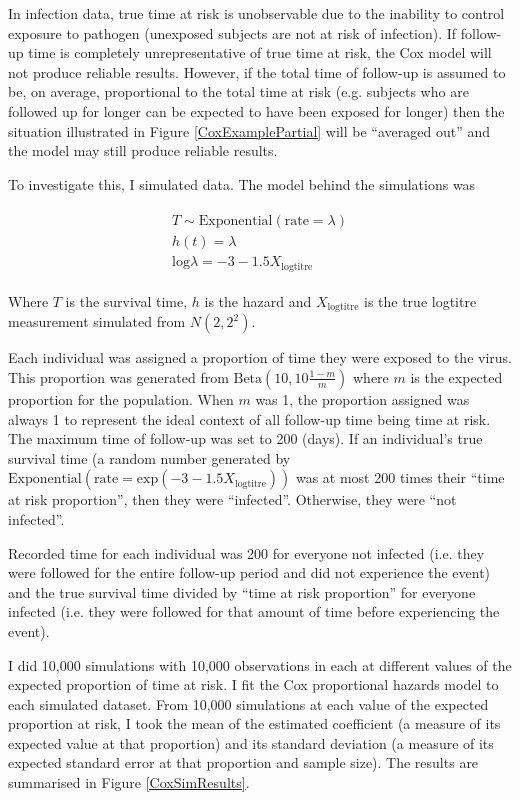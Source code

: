 \documentclass[12pt]{article}
\begin{document}
\pagebreak

In infection data, true time at risk is unobservable due to the inability to control exposure to pathogen (unexposed subjects are not at risk of infection). If follow-up time is completely unrepresentative of true time at risk, the Cox model will not produce reliable results. However, if the total time of follow-up is assumed to be, on average, proportional to the total time at risk (e.g. subjects who are followed up for longer can be expected to have been exposed for longer) then the situation illustrated in Figure  \ref{CoxExamplePartial} will be ``averaged out'' and the model may still produce reliable results.

To investigate this, I simulated data. The model behind the simulations was

\begin{align*}
\begin{gathered}
T \sim \text{Exponential}(\text{rate} = \lambda) \\
h(t) = \lambda \\
\text{log}\lambda = -3 - 1.5 X_{\text{logtitre}}
\end{gathered}
\end{align*}

Where $T$ is the survival time, $h$ is the hazard and $X_{\text{logtitre}}$ is the true logtitre measurement simulated from $N(2, 2^2)$.

Each individual was assigned a proportion of time they were exposed to the virus. This proportion was generated from $\text{Beta}(10, 10\frac{1-m}{m})$ where $m$ is the expected proportion for the population. When $m$ was 1, the proportion assigned was always 1 to represent the ideal context of all follow-up time being time at risk. The maximum time of follow-up was set to 200 (days). If an individual's true survival time (a random number generated by $\text{Exponential}(\text{rate} = \text{exp}(-3 - 1.5 X_{\text{logtitre}}) )$ was at most 200 times their ``time at risk proportion'', then they were ``infected''. Otherwise, they were ``not infected''. 

Recorded time for each individual was 200 for everyone not infected (i.e. they were followed for the entire follow-up period and did not experience the event) and the true survival time divided by ``time at risk proportion'' for everyone infected (i.e. they were followed for that amount of time before experiencing the event).

I did 10,000 simulations with 10,000 observations in each at different values of the expected proportion of time at risk. I fit the Cox proportional hazards model to each simulated dataset. From 10,000 simulations at each value of the expected proportion at risk, I took the mean of the estimated coefficient (a measure of its expected value at that proportion) and its standard deviation (a measure of its expected standard error at that proportion and sample size). The results are summarised in Figure \ref{CoxSimResults}.
\end{document}
